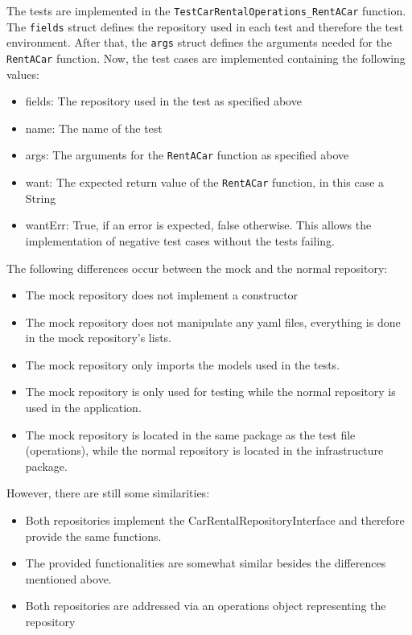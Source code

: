 The tests are implemented in the \texttt{TestCarRentalOperations\_RentACar} function.
The \texttt{fields} struct defines the repository used in each test and therefore the test environment.
After that, the \texttt{args} struct defines the arguments needed for the \texttt{RentACar} function.
Now, the test cases are implemented containing the following values:
\begin{itemize}
      \item fields: The repository used in the test as specified above
      \item name: The name of the test
      \item args: The arguments for the \texttt{RentACar} function as specified above
      \item want: The expected return value of the \texttt{RentACar} function, in this case a String 
      \item wantErr: True, if an error is expected, false otherwise. 
            This allows the implementation of negative test cases without the tests failing.
\end{itemize}

The following differences occur between the mock and the normal repository:
\begin{itemize}
      \item The mock repository does not implement a constructor
      \item The mock repository does not manipulate any yaml files, everything is done in the mock repository's lists.
      \item The mock repository only imports the models used in the tests.
      \item The mock repository is only used for testing while the normal repository is used in the application.
      \item The mock repository is located in the same package as the test file (operations), while the normal repository is located in the infrastructure package.
\end{itemize}

However, there are still some similarities:
\begin{itemize}
      \item Both repositories implement the CarRentalRepositoryInterface and therefore provide the same functions.
      \item The provided functionalities are somewhat similar besides the differences mentioned above.
      \item Both repositories are addressed via an operations object representing the repository
\end{itemize}

